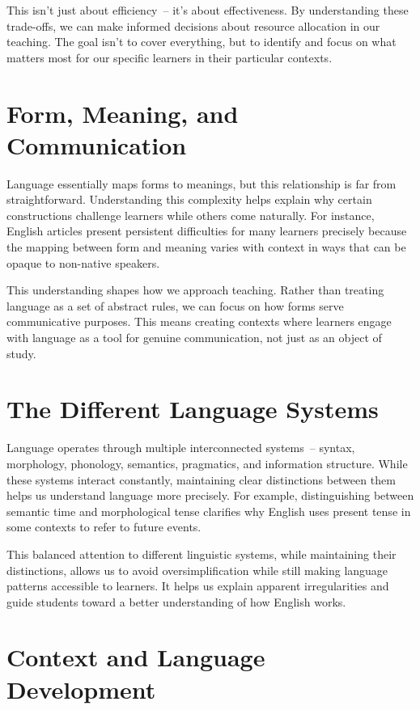 This isn't just about efficiency~-- it's about effectiveness. By understanding these trade-offs, we can make informed decisions about resource allocation in our teaching. The goal isn't to cover everything, but to identify and focus on what matters most for our specific learners in their particular contexts.

\section*{Form, Meaning, and Communication}

Language essentially maps forms to meanings, but this relationship is far from straightforward. Understanding this complexity helps explain why certain constructions challenge learners while others come naturally. For instance, English articles present persistent difficulties for many learners precisely because the mapping between form and meaning varies with context in ways that can be opaque to non-native speakers.

This understanding shapes how we approach teaching. Rather than treating language as a set of abstract rules, we can focus on how forms serve communicative purposes. This means creating contexts where learners engage with language as a tool for genuine communication, not just as an object of study.

\section*{The Different Language Systems}

Language operates through multiple interconnected systems~-- syntax, morphology, phonology, semantics, pragmatics, and information structure. While these systems interact constantly, maintaining clear distinctions between them helps us understand language more precisely. For example, distinguishing between semantic time and morphological tense clarifies why English uses present tense in some contexts to refer to future events.

This balanced attention to different linguistic systems, while maintaining their distinctions, allows us to avoid oversimplification while still making language patterns accessible to learners. It helps us explain apparent irregularities and guide students toward a better understanding of how English works.

\section*{Context and Language Development}

